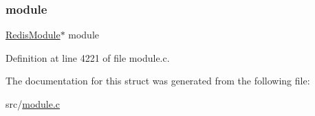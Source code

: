 \subsubsection{\texorpdfstring{module}{module}}
{\footnotesize\ttfamily \hyperlink{struct_redis_module}{Redis\+Module}$\ast$ module}



Definition at line 4221 of file module.\+c.



The documentation for this struct was generated from the following file\+:\begin{DoxyCompactItemize}
\item 
src/\hyperlink{module_8c}{module.\+c}\end{DoxyCompactItemize}
